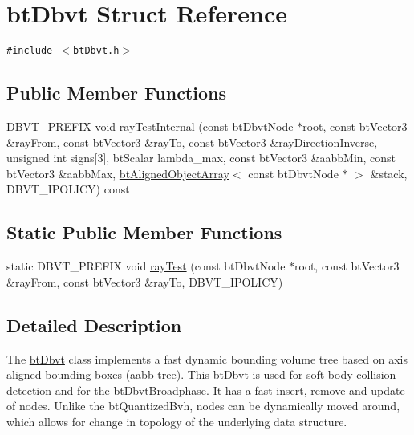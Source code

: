 \hypertarget{structbt_dbvt}{
\section{btDbvt Struct Reference}
\label{structbt_dbvt}
}
{\tt \#include $<$btDbvt.h$>$}

\subsection*{Public Member Functions}
\begin{CompactItemize}
\item 
DBVT\_\-PREFIX void \hyperlink{structbt_dbvt_f8f2ca01be7eadc4732464272f580028}{rayTestInternal} (const btDbvtNode $\ast$root, const btVector3 \&rayFrom, const btVector3 \&rayTo, const btVector3 \&rayDirectionInverse, unsigned int signs\mbox{[}3\mbox{]}, btScalar lambda\_\-max, const btVector3 \&aabbMin, const btVector3 \&aabbMax, \hyperlink{classbt_aligned_object_array}{btAlignedObjectArray}$<$ const btDbvtNode $\ast$ $>$ \&stack, DBVT\_\-IPOLICY) const 
\end{CompactItemize}
\subsection*{Static Public Member Functions}
\begin{CompactItemize}
\item 
static DBVT\_\-PREFIX void \hyperlink{structbt_dbvt_8e316ee3bc9bd7b7354086c0c558cfb5}{rayTest} (const btDbvtNode $\ast$root, const btVector3 \&rayFrom, const btVector3 \&rayTo, DBVT\_\-IPOLICY)
\end{CompactItemize}


\subsection{Detailed Description}
The \hyperlink{structbt_dbvt}{btDbvt} class implements a fast dynamic bounding volume tree based on axis aligned bounding boxes (aabb tree). This \hyperlink{structbt_dbvt}{btDbvt} is used for soft body collision detection and for the \hyperlink{structbt_dbvt_broadphase}{btDbvtBroadphase}. It has a fast insert, remove and update of nodes. Unlike the btQuantizedBvh, nodes can be dynamically moved around, which allows for change in topology of the underlying data structure. 

